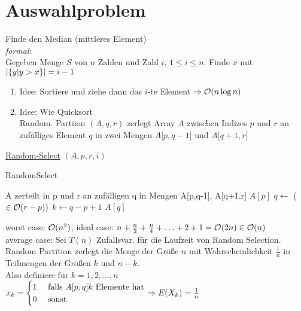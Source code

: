     \section{Auswahlproblem} 
        Finde den Median (mittleres Element) \\
        \emph{formal}:\\ Gegeben Menge $S$ von $n$ Zahlen und Zahl $i$, $1 \leq i \leq n$. Finde $x$ mit $\left| \{ y | y> x \} \right| = i - 1$
       
        \begin{enumerate}[1.]
            \item Idee: Sortiere und ziehe dann das $i$-te Element $\Ra \LO(n \log n)$


               \item Idee: Wie Quicksort \\
                Random. Partiion $(A, q,r)$ zerlegt Array $A$ zwischen Indizes $p$ und $r$ an zufälliges Element $q$ in zwei Mengen 
               $A \lbrack p, q-1 \rbrack$ und $A \lbrack q+1, r \rbrack$ 
        \end{enumerate}
            \underline{Random-Select} $(A,p,r,i)$ \\
\begin{algorithm}
\caption{RandomSelect}
\label{alg:randomSelect}
\begin{algorithmic}[1]
\State A zerteilt in p und r an zufälligen q in Mengen A[p,q-1], A[q+1,r]
\EndFunction
{}
		\Return $A[p]$
	\EndIf
	\State $q \gets$  ($\in \mathcal{O}(r-p))$
	\State $k \gets q-p+1$
		$A[q]$
	\Else
		\State\Return{}
	\Else\ 
		\State\Return{}
	\EndIf
	\EndIf
\EndFunction
\end{algorithmic}
\end{algorithm}
           worst case: $\mathcal{O}(n^2)$, ideal case: $n + \frac{n}{2} + \frac{n}{4} + \ldots + 2 + 1 = \mathcal{O}(2n) \in \mathcal{O}(n)$ \\
            average case: Sei $T(n)$ Zufallsvar. für die Laufzeit von Random Selection. \\
            Random Partition zerlegt die Menge der Größe $n$ mit Wahrscheinlichkeit $\frac{1}{n}$ in Teilmengen der Größen $k$ und $n-k$. \\
            Also definiere für $k=1,2, \ldots, n$ \\
           $x_k = \begin{cases} 1 & \text{ falls } A \lbrack p,q \rbrack  k \text{ Elemente hat} \\
            0 & \text{ sonst}
            \end{cases} \Ra E(X_k) = \frac{1}{n}$
